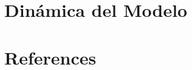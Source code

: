 \documentclass[
  letterpaper,
  DIV=11,
  numbers=noendperiod]{scrreprt}
\newlength{\cslhangindent}
\newenvironment{CSLReferences}[2] %
 {\begin{list}{}{%
  \setlength{\itemindent}{0pt}
  \setlength{\leftmargin}{0pt}
  \setlength{\parsep}{0pt}
  \ifodd #1
   \setlength{\leftmargin}{\cslhangindent}
   \setlength{\itemindent}{-1\cslhangindent}
  \fi
  \setlength{\itemsep}{#2\baselineskip}}}
 {\end{list}}
\begin{document}

\chapter{Dinámica del Modelo}\label{dinuxe1mica-del-modelo}


\chapter*{References}\label{references}


\label{refs}
\begin{CSLReferences}{0}{1}
\end{CSLReferences}
\end{document}
